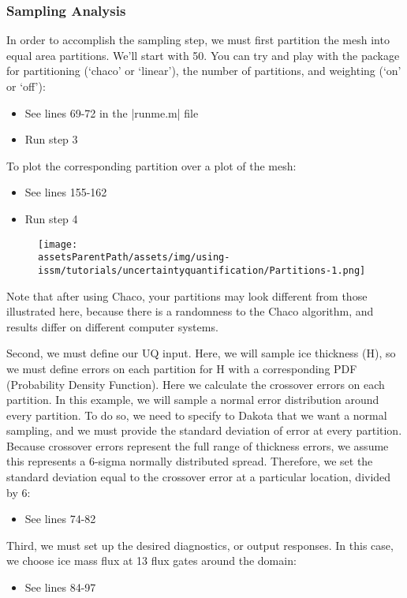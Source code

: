 \subsubsection{Sampling Analysis} %
In order to accomplish the sampling step, we must first partition the mesh into equal area partitions. We'll start with 50. You can try and play with the package for partitioning (`chaco' or `linear'), the number of partitions, and weighting (`on' or `off'):
\begin{itemize}
	\item See lines 69-72 in the \lstinlinebg|runme.m| file
	\item Run step 3
\end{itemize}
To plot the corresponding partition over a plot of the mesh:
\begin{itemize}
	\item See lines 155-162
	\item Run step 4
\end{itemize}
\begin{figure}[H]
	\begin{center}
		\texttt{[image: \\assetsParentPath/assets/img/using-issm/tutorials/uncertaintyquantification/Partitions-1.png]}
	\end{center}
\end{figure}
Note that after using Chaco, your partitions may look different from those illustrated here, because there is a randomness to the Chaco algorithm, and results differ on different computer systems.

Second, we must define our UQ input. Here, we will sample ice thickness (H), so we must define errors on each partition for H with a corresponding PDF (Probability Density Function). Here we calculate the crossover errors on each partition. In this example, we will sample a normal error distribution around every partition. To do so, we need to specify to Dakota that we want a normal sampling, and we must provide the standard deviation of error at every partition. Because crossover errors represent the full range of thickness errors, we assume this represents a 6-sigma normally distributed spread. Therefore, we set the standard deviation equal to the crossover error at a particular location, divided by 6:
\begin{itemize}
	\item See lines 74-82
\end{itemize}

Third, we must set up the desired diagnostics, or output responses. In this case, we choose ice mass flux at 13 flux gates around the domain:
\begin{itemize}
	\item See lines 84-97
\end{itemize}

